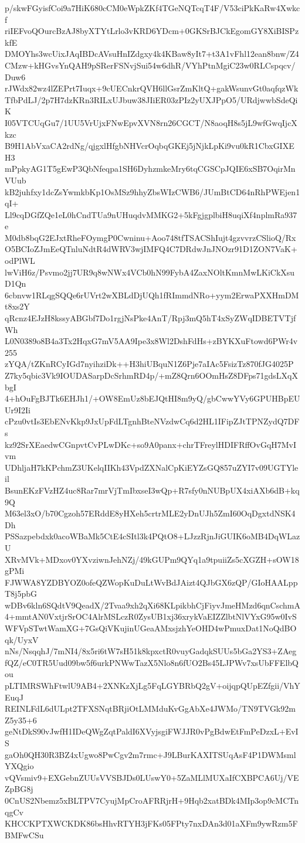 p/skwFGyisfCoi9a7HiK680cCM0eWpkZKf4TGeNQTcqT4F/V53ciPkKaRw4Xwkcf
riIEFvoQOurcBzAJ8byXTYtLrlo3vKRD6YDcm+0GKSrBJCkEgomGY8XiBISPzkfE
DMOYhs3wcUixJAqIBDcAVsuHnIZdgxy4k4KBaw8yIt7+t3A1vFhl12ean8bnw/Z4
CMzw+kHGvsYnQAH9pSRerFSNvjSui54w6dhR/VYhPtnMgiC23w0RLCspqcv/Duw6
rJWdx82wz4lZEPrt7Iuqx+9cUECnkrQVH6llGsrZmKltQ+gakWsunvGt0aqfqzWk
TfbPdLJ/2p7H7dzKRn3RILxUJbuw38JIiER03zPIz2yUXJPpO5/URdjwwbSdeQiK
I05VTCUqGu7/1UU5VrUjxFNwEpvXVN8rn26CGCT/N8aoqH8s5jL9wfGwqIjcXkzc
B9H1AbVxaCA2rdNg/qjgxlHfgbNHVcrOqbqGKEj5jNjkLpKi9vu0kR1CbxGIXEH3
mPpkyAG1T5gEwP3QbNfeqpa1SH6DyhzmkeMry6tqCGSCpJQIE6xSB7OqirMnVUub
kB2juhfxy1dcZsYwmkbKp1OsMSz9hhyZbsWIzCWB6/JUmBtCD64nRhPWEjen1qI+
Ll9cqDGfZQe1eL0hCndTUa9nUHuqdvMMKG2+5kFgjgplbiH8uqiXf4nplmRa937e
M0db8bqG2EJxtRheFOymgP0Cwninu+Aoo748tfTSACShIujt4gzvvrzCSlioQ/Rx
O5BCIoZJmEeQTnluNdtR4dWRV3wjIMFQ4C7DRdwJnJNOzr91D1ZON7VaK+odPlWL
lwViH6z/Psvmo2jj7UR9q8wNWx4VCb0hN99FybA4ZaxNOltKmnMwLKiCkXsuD1Qn
6cbnvw1RLqgSQQe6rUVrt2wXBLdDjUQh1fRImmdNRo+yym2ErwaPXXHmDMt8xs2Y
qRcnz4EJzH8kssyABGbf7Do1rgjNsPke4AnT/Rpj3mQ5hT4xSyZWqIDBETVTjfWh
L0N0389o8B4a3Tx2HqxG7mV5AA9Ipe3x8Wl2DshFdHs+zBYKXuFtowd6PWr4v255
zYQA/tZKnRCyIGd7nyihziDk++H3hiUBquN1Z6Pje7aIAc5FsizTz870fJG4025P
Z7ky5qbic3Vk9IOUDASarpDcSrhmRD4p/+mZ8Qrn6OOmHsZ8DFps71gdsLXqXbgI
4+hOuFgBJTk6EHJh1/+OW8EmUz8bEJQtHI8m9yQ/gbCwwYVy6GPUHBpEUUr9I2Ii
cPzu0vtIs3EbENvKkp9JxUpFdLTgnhBteNVzdwCq6d2HL1IFipZJtTPNZydQ7DFs
kz92SrXEaedwCGnpvtCvPLwDKc+so9A0panx+chrTFreylHDIFRffOvGqH7MvIvm
UDhljaH7kKPchmZ3UKelqIIKh43VpdZXNalCpKiEYZsGQ857uZYI7v09UGTYleil
BsunEKzFVzHZ4uc8Rar7mrVjTmIbxseI3wQp+R7sfy0nNUBpUX4xiAXb6dB+kq9Q
M63el3xO/b70Cgzoh57ERddE8yHXeh5crtrMLE2yDnUJh5ZmI60OqDgxtdNSK4Dh
PSSazpebdxk0acoWBaMk5CtE4cSItl3k4PQtO8+LJzzRjnJiGUIK6oMB4DqWLazU
XRvMVk+MDxov0YXvziwnJehNZj/49kGUPm9QYq1a9tpuiiZs5cXGZH+sOW18gPMi
FJWWA8YZDBYOZ0ofeQZWopKuDuLtWvBdJAizt4QJbGX6zQP/GIoHAALppT8j5pbG
wDBv6kln6SQdtV9QeadX/2Tvaa9xh2qXi68KLpikbhCjFiyvJmeHMzd6qnCschmA
4+mmtAN0VxtjrSrOC4AlrMSLczR0ZysUB1xj36xrykVaEIZZlbtNlVYxG95w0IvS
WFVpSTwtWamXG+7GsQiVKujinUGeaAMxsjzhYeOHD4wPmuxDat1NoQdBOqk/UyxV
nNs/NsqqhJ/7mNI4/8x5ri6tW7sH51k8kpxctR0vuyGadqkSUUs5bGa2YS3+ZAeg
fQZ/eC0TR5Uud09bw5f6urkPNWwTazX5Nlo8n6fUO2Bs45LJPWv7xsUbFFElbQou
pLTIMRSWhFtwlU9AB4+2XNKzXjLg5FqLGYBRbQ2gV+oijqpQUpEZfgii/VhYEuqJ
REINLFdL6dULpt2TFXSNqtBRjiOtLMMduKvGgAbXe4JWMo/TN9TVGk92mZ5y35+6
geNtDkS90vJwfH1IDeQWgZqtPaldI6XVyjsgiFWJJR0vPgBdwEtFmPeDzxL+EvIS
gaOh0QH30R3BZ4xUgwo8PwCgv2m7rmc+J9LBurKAXITSUqAsF4P1DWMsmlYXQgio
vQVsmiv9+EXGebnZUUsVVSBJDs0LUswY0+5ZaMLlMUXaIfCXBPCA6Uj/VEZpBG8j
0CnUS2Nbemz5xBLTPV7CyujMpCroAFRRjrH+9Hqb2xatBDk4MIp3op9cMCTnqgCv
KHCCKPTXWCKDK86bsHhvRTYH3jFKs05FPty7nxDAn3d01aXFm9ywRzm5FBMFwCSu
